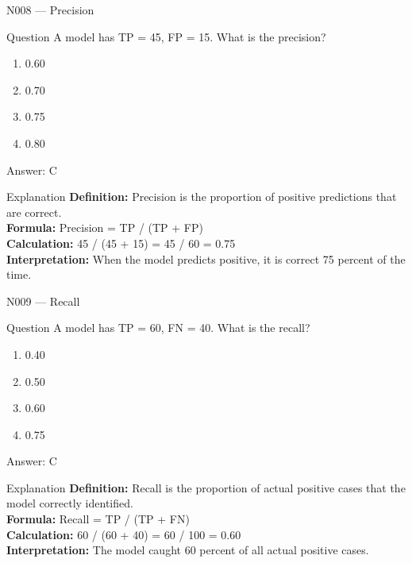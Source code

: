 \documentclass[aspectratio=169,8pt]{beamer}
\begin{document}
	\begin{frame}{N008 --- Precision}
		\begin{block}{Question}
			A model has TP = 45, FP = 15. What is the precision?
			\begin{enumerate}
				\item 0.60
				\item 0.70
				\item 0.75
				\item 0.80
			\end{enumerate}
		\end{block}
		\begin{exampleblock}{Answer: C}\end{exampleblock}
		\begin{block}{Explanation}
			\textbf{Definition:} Precision is the proportion of positive predictions that are correct.\\
			\textbf{Formula:} Precision = TP / (TP + FP)\\
			\textbf{Calculation:} 45 / (45 + 15) = 45 / 60 = 0.75\\
			\textbf{Interpretation:} When the model predicts positive, it is correct 75 percent of the time.
		\end{block}
	\end{frame}
	
	\begin{frame}{N009 --- Recall}
		\begin{block}{Question}
			A model has TP = 60, FN = 40. What is the recall?
			\begin{enumerate}
				\item 0.40
				\item 0.50
				\item 0.60
				\item 0.75
			\end{enumerate}
		\end{block}
		\begin{exampleblock}{Answer: C}\end{exampleblock}
		\begin{block}{Explanation}
			\textbf{Definition:} Recall is the proportion of actual positive cases that the model correctly identified.\\
			\textbf{Formula:} Recall = TP / (TP + FN)\\
			\textbf{Calculation:} 60 / (60 + 40) = 60 / 100 = 0.60\\
			\textbf{Interpretation:} The model caught 60 percent of all actual positive cases.
		\end{block}
	\end{frame}
	
\end{document}
